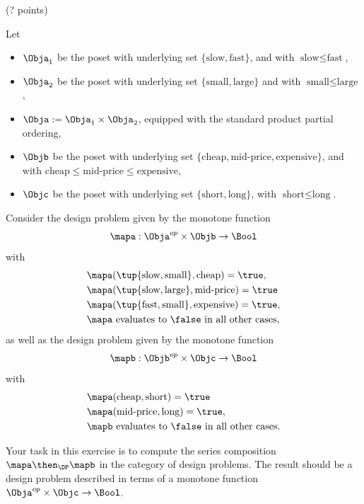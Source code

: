 \documentclass[paper=8.125in:10.250in,pagesize=pdftex,
    headinclude=false,footinclude=false,oneside,egregdoesnotlikesansseriftitles]{kaobook}
\begin{document}
\begin{gradedexercise}\label{ex:ComposingDesignProblems} (? points) 


Let 
\begin{itemize}
\item $\Obja_1$ be the poset with underlying set $\{ \text{slow}, \text{fast} \}$, and with $\text{slow} \leq \text{fast}$,
\item $\Obja_2$ be the poset with underlying set $\{ \text{small}, \text{large} \}$ and with $\text{small} \leq \text{large}$,
\item $\Obja := \Obja_1 \times \Obja_2$, equipped with the standard product partial ordering,
\item $\Objb$ be the poset with underlying set $\{ \text{cheap}, \text{mid-price}, \text{expensive} \}$, and with $\text{cheap} \leq \text{mid-price} \leq \text{expensive}$,
\item $\Objc$ be the poset with underlying set $\{ \text{short}, \text{long} \}$, with $\text{short} \leq \text{long}$. 
\end{itemize}
Consider the design problem given by the monotone function 
\begin{equation}
\mapa: \Obja^{op} \times \Objb \to \Bool
\end{equation}
with 
\begin{align*}
&\mapa(\tup{ \text{slow}, \text{small}}, \text{cheap}) = \true, \\
&\mapa(\tup{ \text{slow}, \text{large}}, \text{mid-price}) = \true \\
&\mapa(\tup{ \text{fast}, \text{small}}, \text{expensive}) =  \true, \\
&\mapa \text{ evaluates to } \false \text{ in all other cases},
\end{align*}
as well as the design problem given by the monotone function 
\begin{equation}
\mapb: \Objb^{op} \times \Objc \to \Bool
\end{equation}
with 
\begin{align*}
&\mapa( \text{cheap}, \text{short}) = \true \\
&\mapa(\text{mid-price}, \text{long}) = \true, \\
&\mapb \text{ evaluates to } \false \text{ in all other cases}.
\end{align*}

Your task in this exercise is to compute the series composition $\mapa \then_\DP \mapb$ in the category of design problems. The result should be a design problem described in terms of a monotone function $\Obja^{op} \times \Objc \to \Bool$.
\end{gradedexercise}
\end{document}
